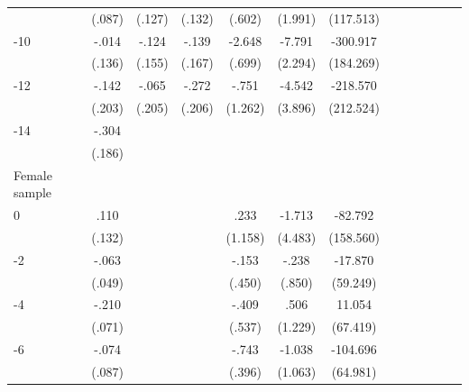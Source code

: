 \begin{table}[hp]
\begin{adjustbox}{max width=\linewidth}
\begin{threeparttable}
{\begin{tabular}{l*{6}{S
S}}
                &   (.087)         &   (.127)         &   (.132)         &   (.602)         &  (1.991)         &(117.513)         \\
-10            &    -.014         &    -.124         &    -.139         &   -2.648\sym{***}&   -7.791\sym{***}& -300.917         \\
                &   (.136)         &   (.155)         &   (.167)         &   (.699)         &  (2.294)         &(184.269)         \\
-12           &    -.142         &    -.065         &    -.272         &    -.751         &   -4.542         & -218.570         \\
                &   (.203)         &   (.205)         &   (.206)         &  (1.262)         &  (3.896)         &(212.524)         \\
-14           &    -.304         &                  &                  &                  &                  &                  \\
                &   (.186)         &                  &                  &                  &                  &                  \\
\midrule
Female sample &&&&&&\\
0               &     .110         &         &         &     .233         &   -1.713         &  -82.792         \\
                &   (.132)         &         &         &  (1.158)         &  (4.483)         &(158.560)         \\
-2             &    -.063         &         &         &    -.153         &    -.238         &  -17.870         \\
                &   (.049)         &         &         &   (.450)         &   (.850)         & (59.249)         \\
-4             &    -.210\sym{***}&         &         &    -.409         &     .506         &   11.054         \\
                &   (.071)         &         &         &   (.537)         &  (1.229)         & (67.419)         \\
-6             &    -.074         &         &         &    -.743\sym{*}  &   -1.038         & -104.696         \\
                &   (.087)         &         &         &   (.396)         &  (1.063)         & (64.981)         \\

\end{tabular}}
\end{threeparttable}
\end{adjustbox}
\end{table}
